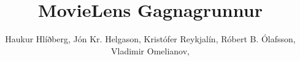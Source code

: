 
\renewcommand{\d}[1]{\;\textsf{d}#1}
\newcommand{\pd}[1]{\partial #1}
\newcommand{\D}{\;\textsf{D}}
\providecommand{\e}[1]{\ensuremath{\times 10^{#1}}}
\newcommand{\kg}[1]{\SI{#1}{\kilo\gram}}
\newcommand{\mA}[1]{\SI{#1}{\milli\ampere}}
\newcommand{\amp}[1]{SI{#1}{\ampere\xspace}}


\newcommand{\realset}{\ensuremath{\mathbb{R}}}
\newcommand{\intset}{\ensuremath{\mathbb{Z}}}
\newcommand{\ratset}{\ensuremath{\mathbb{Q}}}


\newcommand{\adfr}{\ensuremath{\text{FR}}}
\newcommand{\addp}{\ensuremath{\text{DP}}}
\newcommand{\adpv}{\ensuremath{\text{PV}}}

\newcommand{\cfigure}[2]{\begin{figure}[h]
\centering %
\texttt{[image: \#1]}%
\caption{#2\label{fig:#1}}%
\end{figure}%
}
\newcommand{\cfiguresize}[3]{\begin{figure}[h]
\centering %
\texttt{[image: \#1]}%
\caption{#2\label{fig:#1}}%
\end{figure}%
}



\author{Haukur Hlíðberg, Jón Kr. Helgason, Kristófer Reykjalín, Róbert B. Ólafsson, Vladimir Omelianov,}  %
\title{MovieLens Gagnagrunnur}  %
\graphicspath{{graphics/}{Graphics/}{./}}

\usepackage[backend=biber, bibencoding=utf8, style=ieee]{biblatex}


\usepackage{caption}
\captionsetup[figure]{name=Mynd}

\usepackage[final,hidelinks]{hyperref} %
